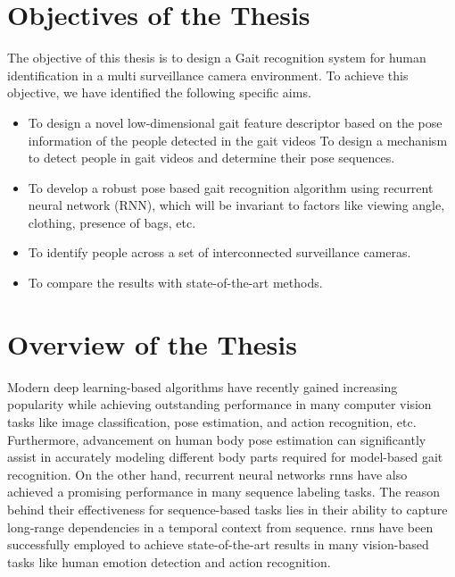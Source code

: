 \section{Objectives of the Thesis}
The objective of this thesis is to design a Gait recognition system for human identification in a multi surveillance camera environment. To achieve this objective, we have identified the following specific aims.
\begin{itemize}
\item To design a novel low-dimensional gait feature descriptor based on the pose information of the people detected in the gait videos To design a mechanism to detect people in gait videos and determine their pose sequences. 
\item To develop a robust pose based gait recognition algorithm using recurrent neural network (RNN), which will be invariant to factors like viewing angle, clothing, presence of bags, etc.
\item To identify people across a set of interconnected surveillance cameras.
\item To compare the results with state-of-the-art methods.
\end{itemize}



\section{Overview of the Thesis}
Modern deep learning-based algorithms have recently gained increasing popularity while achieving outstanding performance in many computer vision tasks like image classification, pose estimation, and action recognition, etc. Furthermore, advancement on human body pose estimation can significantly assist in accurately modeling different body parts required for model-based gait recognition. On the other hand, recurrent neural networks \gls{rnn}s have also achieved a promising performance in many sequence labeling tasks. The reason behind their effectiveness for sequence-based tasks lies in their ability to capture long-range dependencies in a temporal context from sequence. \gls{rnn}s have been successfully employed to achieve state-of-the-art results in many vision-based tasks like human emotion detection and action recognition.

